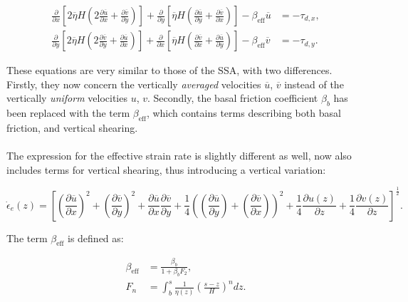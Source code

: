 \documentclass{article}
\begin{document}
\begin{align} \label{eq:DIVA_01}
\frac{\partial}{\partial x} \left[ 2 \overline{\eta} H \left( 2 \frac{\partial \overline{u}}{\partial x} + 
\frac{\partial \overline{v}}{\partial y} \right) \right] + 
\frac{\partial}{\partial y} \left[ \overline{\eta} H \left( \frac{\partial \overline{u}}{\partial y} + 
\frac{\partial \overline{v}}{\partial x} \right) \right] - \beta_{\textrm{eff}} \overline{u} &= -\tau_{d,x}, \\
\frac{\partial}{\partial y} \left[ 2 \overline{\eta} H \left( 2 \frac{\partial \overline{v}}{\partial y} + 
\frac{\partial \overline{u}}{\partial x} \right) \right] + 
\frac{\partial}{\partial x} \left[ \overline{\eta} H \left( \frac{\partial \overline{v}}{\partial x} + 
\frac{\partial \overline{u}}{\partial y} \right) \right] - \beta_{\textrm{eff}} \overline{v} &= -\tau_{d,y}.
\end{align}

These equations are very similar to those of the SSA, with two differences. Firstly, they now concern the vertically \emph{ averaged} velocities $\overline{u}$, $\overline{v}$ instead of the vertically \emph{uniform} velocities $u$, $v$. Secondly, the basal friction coefficient $\beta_b$ has been replaced with the term $\beta_{\textrm{eff}}$, which contains terms describing both basal friction, and vertical shearing.\\
\\
The expression for the effective strain rate is slightly different as well, now also includes terms for vertical shearing, thus introducing a vertical variation:

\begin{equation} \label{eq:DIVA_02}
{\dot{\epsilon}}_e \left( z \right) = { \left[ {\left( \frac{\partial \overline{u}}{\partial x} \right) }^2 + {\left( \frac{\partial \overline{v}}{\partial y} \right) }^2 + \frac{\partial \overline{u}}{\partial x} \frac{\partial \overline{v}}{\partial y} + \frac14 {\left( {\left( \frac{\partial \overline{u}}{\partial y} \right) } + {\left( \frac{\partial \overline{v}}{\partial x} \right) } \right)}^2 + \frac14 \frac{\partial u \left( z \right)}{\partial z} + \frac14 \frac{\partial v \left( z \right)}{\partial z} \right] }^{\frac12}.
\end{equation}

The term $\beta_{\textrm{eff}}$ is defined as:

\begin{align} \label{DIVA_03}
\beta_{\textrm{eff}} &= \frac{\beta_b}{1 + \beta_b F_2}, \\
F_n &= \int_b^s \frac{1}{\eta \left( z \right)} {\left( \frac{s - z}{H} \right)}^n dz.
\end{align}
\end{document}
